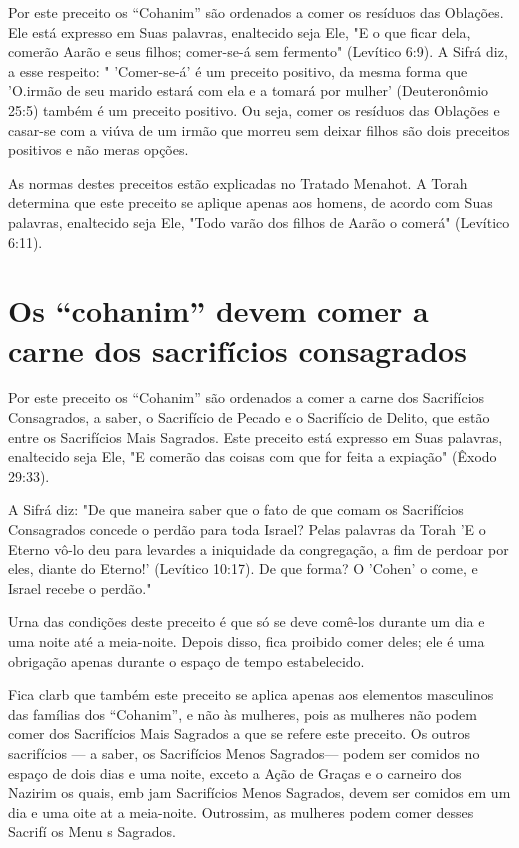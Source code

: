 Por este preceito os ``Cohanim'' são ordenados a comer os resíduos das
Oblações. Ele está expresso em Suas palavras, enaltecido seja Ele, "E o
que ficar dela, comerão Aarão e seus filhos; comer-se-á sem fermento"
(Levítico 6:9). A Sifrá diz, a esse respeito: " 'Comer-se-á' é um
preceito positivo, da mesma forma que 'O.irmão de seu
marido estará com ela e a tomará por mulher' (Deu­teronômio 25:5) também
é um preceito positivo. Ou seja, comer os resíduos das Oblações e
casar-se com a viúva de um irmão que morreu sem deixar filhos são dois
preceitos positivos e não meras opções.

As normas destes preceitos estão explicadas no Tratado Menahot. A Torah
determina que este preceito se aplique apenas aos homens, de acordo com
Suas palavras, enaltecido seja Ele, "Todo varão dos filhos de Aarão o
co­merá" (Levítico 6:11).

\section{Os ``cohanim'' devem comer a carne dos sacrifícios consagrados}

Por este preceito os ``Cohanim'' são ordenados a comer a carne dos
Sacrifícios Consagrados, a saber, o Sacrifício de Pecado e o Sacrifício
de Delito, que estão entre os Sacrifícios Mais Sagrados. Este preceito
está expresso em Suas palavras, enaltecido seja Ele, "E comerão das
coisas com que for feita a expia­ção" (Êxodo 29:33).

A Sifrá diz: "De que maneira saber que o fato de que comam os
Sa­crifícios Consagrados concede o perdão para toda Israel? Pelas
palavras da To­rah 'E o Eterno vô-lo deu para levardes a iniquidade da
congregação, a fim de perdoar por eles, diante do Eterno!' (Levítico
10:17). De que forma? O 'Cohen' o come, e Israel recebe o perdão."

Urna das condições deste preceito é que só se deve comê-los duran­te um
dia e uma noite até a meia-noite. Depois disso, fica proibido comer
de­les; ele é uma obrigação apenas durante o espaço de tempo
estabelecido.

Fica clarb que também este preceito se aplica apenas aos elementos
masculinos das famílias dos ``Cohanim'', e não às mulheres, pois as
mulheres não podem comer dos Sacrifícios Mais Sagrados a que se refere
este preceito. Os outros sacrifícios --- a saber, os Sacrifícios Menos
Sagrados--- podem ser co­midos no espaço de dois dias e uma noite,
exceto a Ação de Graças e o carnei­ro dos Nazirim os quais, emb jam
Sacrifícios Menos Sagrados, devem ser comidos em um dia e uma oite at a
meia-noite. Outrossim, as mulheres po­dem comer desses Sacrifí os Menu s
Sagrados.

